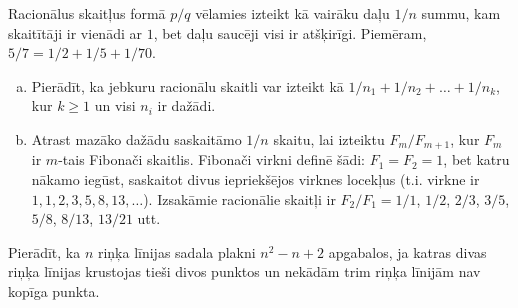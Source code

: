 \documentclass[11pt]{article}
\begin{document}
\begin{problem}[Rosen2019.Ch5.P44]
Racionālus skaitļus formā $p/q$ vēlamies izteikt kā vairāku 
daļu $1/n$ summu, kam skaitītāji ir vienādi ar $1$, bet daļu saucēji 
visi ir atšķirīgi. Piemēram, $5/7 = 1/2 + 1/5 + 1/70$. 
\begin{enumerate}[(a)]
\item Pierādīt, ka jebkuru racionālu skaitli var izteikt kā
$1/n_1 + 1/n_2 + \ldots + 1/n_k$, kur $k \geq 1$ un visi $n_i$ ir dažādi. 
\item Atrast mazāko dažādu saskaitāmo $1/n$ skaitu, lai izteiktu 
$F_{m}/F_{m+1}$, kur $F_m$ ir $m$-tais Fibonači skaitlis. 
Fibonači virkni definē šādi: $F_1 = F_2 = 1$, bet katru nākamo iegūst, saskaitot
divus iepriekšējos virknes locekļus (t.i. virkne ir $1,1,2,3,5,8,13,\ldots$). 
Izsakāmie racionālie skaitļi ir $F_2/F_1 = 1/1$, 
$1/2$, $2/3$, $3/5$, $5/8$, $8/13$, $13/21$ utt.
\end{enumerate}
\end{problem}

\begin{problem}[Rosen2019.Ch5.P49]
Pierādīt, ka $n$ riņķa līnijas sadala plakni $n^2 - n + 2$ apgabalos, 
ja katras divas riņķa līnijas krustojas tieši divos punktos un nekādām 
trim riņķa līnijām nav kopīga punkta.
\end{problem}
\end{document}
